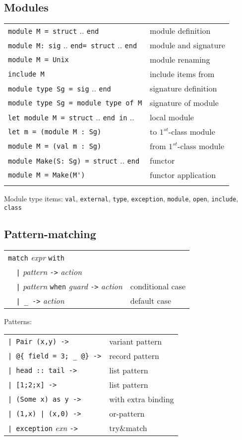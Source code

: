 \documentclass[10pt,landscape]{article}
\begin{document}
\begin{multicols}{3}
{\subsection{Modules}

\begin{tabular}{ll}
\Verb!module M = struct! .. \Verb!end! & module definition\\
\Verb!module M: sig! .. \Verb!end= struct! .. \Verb!end! & module and signature\\
\Verb!module M = Unix! & module renaming \\
\Verb!include M! & include items from \\
\Verb!module type Sg = sig! .. \Verb!end! & signature definition\\
\Verb!module type Sg = module type of M! & signature of module\\
\Verb!let module M = struct! .. \Verb!end in! ..  & local module \\
\Verb!let m = (module M : Sg)! & to $1^{st}$-class module\\
\Verb!module M = (val m : Sg)! & from $1^{st}$-class module\\
\Verb!module Make(S: Sg) = struct! .. \Verb!end! & functor \\
\Verb!module M = Make(M')! & functor application \\
& \\
\end{tabular}

Module type items: \Verb!val!, \Verb!external!, \Verb!type!, \Verb!exception!, \Verb!module!, \Verb!open!, \Verb!include!, \Verb!class!

\subsection{Pattern-matching}

\begin{tabular}{ll}
\Verb!match! \emph{expr} \Verb!with! \\
\Verb!  |! \emph{pattern} \Verb!->! \emph{action}\\
\Verb!  |! \emph{pattern} \Verb!when! \emph{guard} \Verb!->! \emph{action}
& conditional case \\
\Verb!  | _ ->! \emph{action} & default case\\
\end{tabular}
Patterns:\\
\begin{tabular}{ll}
\Verb!| Pair (x,y) ->! & variant pattern \\
\Verb!| @{ field = 3; _ @} ->! & record pattern \\
\Verb!| head :: tail ->! & list pattern \\
\Verb!| [1;2;x] ->! & list pattern \\
\Verb!| (Some x) as y ->! & with extra binding \\
\Verb!| (1,x) | (x,0) ->! & or-pattern \\
\Verb!| exception! \emph{exn} \Verb!->! & try\&match \\
\end{tabular}
}


\end{multicols}
\end{document}
